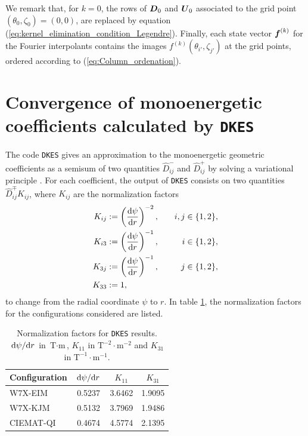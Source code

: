 \documentclass[10pt]{iopart}
\newcommand{\DKES}{{\texttt{DKES}}}
\begin{document}
 We remark that, for $k=0$, the rows of $\vb*{D}_0$ and $\vb*{U}_0$ associated to the grid point $(\theta_0,\zeta_0)=(0,0)$, are replaced by equation (\ref{eq:kernel_elimination_condition_Legendre}). Finally, each state vector $\vb*{f}^{(k)}$ for the Fourier interpolants contains the images $f^{(k)}(\theta_{i'},\zeta_{j'})$ at the grid points, ordered according to (\ref{eq:Column_ordenation}).
 
 	
\section{Convergence of monoenergetic coefficients calculated by {\DKES}}\label{sec:Appendix_DKES_Bounds}

\FloatBarrier
The code {\DKES} gives an approximation to the monoenergetic geometric coefficients as a semisum of two quantities $\widehat{D}_{ij}^- $ and $\widehat{D}_{ij}^+$ by solving a variational principle \cite{VanRij_1989}. For each coefficient, the output of {\DKES} consists on two quantities $\widehat{D}_{ij}^\mp K_{ij}$, where $K_{ij}$ are the normalization factors
%
\begin{align}
	K_{ij} & :=\left(\dv{\psi}{r}\right)^{-2}, &\quad i,j \in\{1,2\},
	\\
	K_{i3} & :=  \left(\dv{\psi}{r} \right)^{-1}, &\quad i \in\{1,2\},
	\\
	K_{3j} & := \left(\dv{\psi}{r} \right)^{-1}, &\quad j \in\{1,2\},
	\\
	K_{33} & := 1, &
\end{align} 
to change from the radial coordinate $\psi$ to $r$. In table \ref{tab:DKES_normalization_factors}, the normalization factors for the configurations considered are listed. 
%
\begin{table}[h]
	\centering
	\begin{tabular}{@{}lccc@{}}
		\toprule
		Configuration & $\dv*{\psi}{r}$ & $K_{11}$    & $K_{31}$    
		\\ \midrule
		W7X-EIM       & 0.5237  & 3.6462 & 1.9095 \\
		W7X-KJM       & 0.5132  & 3.7969 & 1.9486 \\
		CIEMAT-QI     & 0.4674  & 4.5774 & 2.1395 \\ \bottomrule
	\end{tabular}
	\caption{Normalization factors for {\DKES} results. $\dv*{\psi}{r}$ in $\text{T}\cdot\text{m}$, $K_{11}$ in $\text{T}^{-2}\cdot\text{m}^{-2}$ and $K_{31}$ in $\text{T}^{-1}\cdot\text{m}^{-1}$.}
	\label{tab:DKES_normalization_factors}
\end{table}
\end{document}
